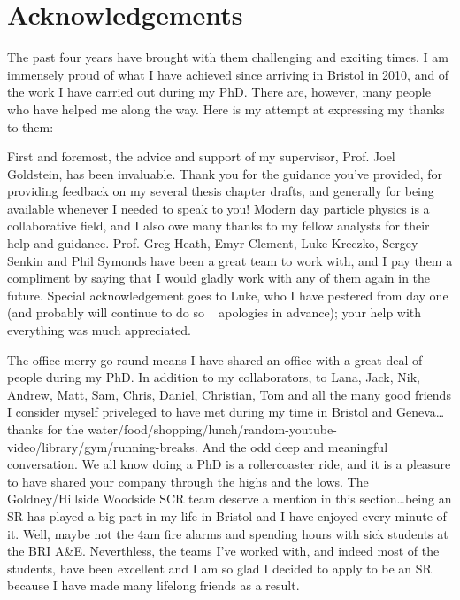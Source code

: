 \chapter*{Acknowledgements} %

The past four years have brought with them challenging and exciting times. I am immensely proud of what I have
achieved since arriving in Bristol in 2010, and of the work I have carried out during my PhD. There are,
however, many people who have helped me along the way. Here is my attempt at expressing my thanks to them:

First and foremost, the advice and support of my supervisor, Prof. Joel Goldstein, has been invaluable. Thank
you for the guidance you've provided, for providing feedback on my several thesis chapter drafts, and
generally for being available whenever I needed to speak to you! Modern day particle physics is a
collaborative field, and I also owe many thanks to my fellow analysts for their help and guidance.
Prof. Greg Heath, Emyr Clement, Luke Kreczko, Sergey Senkin and Phil Symonds have been a great team to
work with, and I pay them a compliment by saying that I would gladly work with any of them again in the
future. Special acknowledgement goes to Luke, who I have pestered from day one (and probably will continue to
do so \textemdash~ apologies in advance); your help with everything was much appreciated.

The office merry-go-round means I have shared an office with a great deal of people during
my PhD. In addition to my collaborators, to Lana, Jack, Nik, Andrew, Matt, Sam, Chris, Daniel, Christian, Tom and
all the many good friends I consider myself priveleged to have met during my time in Bristol and Geneva\ldots
thanks for the water/food/shopping/lunch/random-youtube-video/library/gym/running-breaks. And the odd deep
and meaningful conversation. We all know doing a PhD is a rollercoaster ride, and it is a pleasure to have
shared your company through the highs and the lows. The Goldney/Hillside Woodside SCR team deserve a mention
in this section\ldots being an SR has played a big part in my life in Bristol and I have enjoyed every minute
of it. Well, maybe not the 4am fire alarms and spending hours with sick students at the BRI A\&E. Neverthless,
the teams I've worked with, and indeed most of the students, have been excellent and I am so glad I decided to apply
to be an SR because I have made many lifelong friends as a result.


